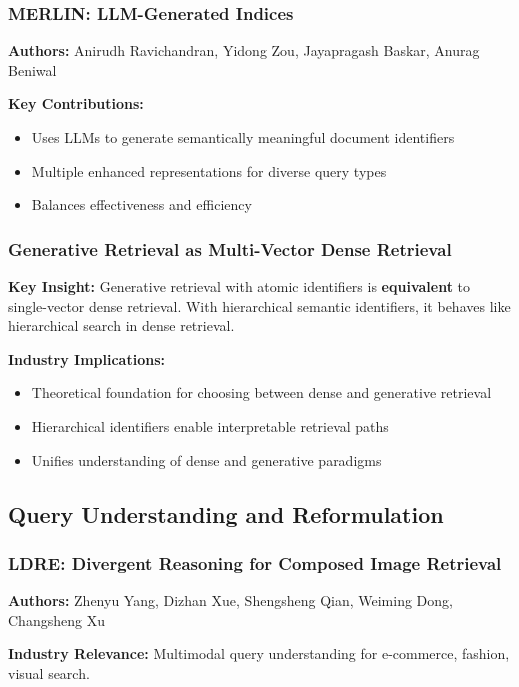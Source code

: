 \documentclass[11pt,letterpaper]{article}
\begin{document}
\subsubsection{MERLIN: LLM-Generated Indices}
\textbf{Authors:} Anirudh Ravichandran, Yidong Zou, Jayapragash Baskar, Anurag Beniwal

\textbf{Key Contributions:}
\begin{itemize}[leftmargin=*]
    \item Uses LLMs to generate semantically meaningful document identifiers
    \item Multiple enhanced representations for diverse query types
    \item Balances effectiveness and efficiency
\end{itemize}

\subsubsection{Generative Retrieval as Multi-Vector Dense Retrieval}

\textbf{Key Insight:} Generative retrieval with atomic identifiers is \textbf{equivalent} to single-vector dense retrieval. With hierarchical semantic identifiers, it behaves like hierarchical search in dense retrieval.

\textbf{Industry Implications:}
\begin{itemize}[leftmargin=*]
    \item Theoretical foundation for choosing between dense and generative retrieval
    \item Hierarchical identifiers enable interpretable retrieval paths
    \item Unifies understanding of dense and generative paradigms
\end{itemize}

\subsection{Query Understanding and Reformulation}

\subsubsection{LDRE: Divergent Reasoning for Composed Image Retrieval}
\textbf{Authors:} Zhenyu Yang, Dizhan Xue, Shengsheng Qian, Weiming Dong, Changsheng Xu

\textbf{Industry Relevance:} Multimodal query understanding for e-commerce, fashion, visual search.
\end{document}
